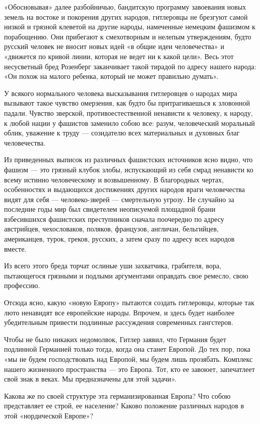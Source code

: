 \documentclass[12pt, a4paper, openany]{book}
\begin{document}
«Обосновывая» далее разбойничью, бандитскую программу завоевания новых земель на востоке и покорения других народов, гитлеровцы не брезгуют самой низкой и грязной клеветой на другие народы, намеченные немецким фашизмом к порабощению. Они прибегают к смехотворным и нелепым утверждениям, будто русский человек не вносит новых идей «в общие идеи человечества» и «движется по кривой линии, которая не ведет ни к какой цели». Весь этот несусветный бред Розенберг заканчивает такой тирадой по адресу нашего народа: «Он похож на малого ребенка, который не может правильно думать».

У всякого нормального человека высказывания гитлеровцев о народах мира вызывают такое чувство омерзения, как будто бы притрагиваешься к зловонной падали. Чувство зверской, противоестественной ненависти к человеку, к народу, к любой нации у фашистов заменило собою все: разум, человеческий моральный облик, уважение к труду — созидателю всех материальных и духовных благ человечества.

Из приведенных выписок из различных фашистских источников ясно видно, что фашизм — это грязный клубок злобы, испускающий из себя смрад ненависти ко всему истинно человеческому и возвышенному. В благородных чертах, особенностях и выдающихся достижениях других народов враги человечества видят для себя — человеко-зверей — смертельную угрозу. Не случайно за последние годы мир был свидетелем неописуемой площадной брани взбесившихся фашистских преступников сначала поочередно по адресу австрийцев, чехословаков, поляков, французов, англичан, бельгийцев, американцев, турок, греков, русских, а затем сразу по адресу всех народов вместе.

Из всего этого бреда торчат ослиные уши захватчика, грабителя, вора, пытающегося грязными и подлыми аргументами оправдать свое ремесло, свою профессию.

Отсюда ясно, какую «новую Европу» пытаются создать гитлеровцы, которые так люто ненавидят все европейские народы. Впрочем, и здесь будет наиболее убедительным привести подлинные рассуждения современных гангстеров.

Чтобы не было никаких недомолвок, Гитлер заявил, что Германия будет подлинной Германией только тогда, когда она станет Европой. До тех пор, пока «мы не будем господствовать над Европой, мы будем лишь прозябать. Комплекс нашего жизненного пространства — это Европа. Тот, кто ее завоюет, запечатлеет свой знак в веках. Мы предназначены для этой задачи».

Какова же по своей структуре эта германизированная Европа? Что собою представляет ее строй, ее население? Каково положение различных народов в этой «нордической Европе»?
\end{document}
